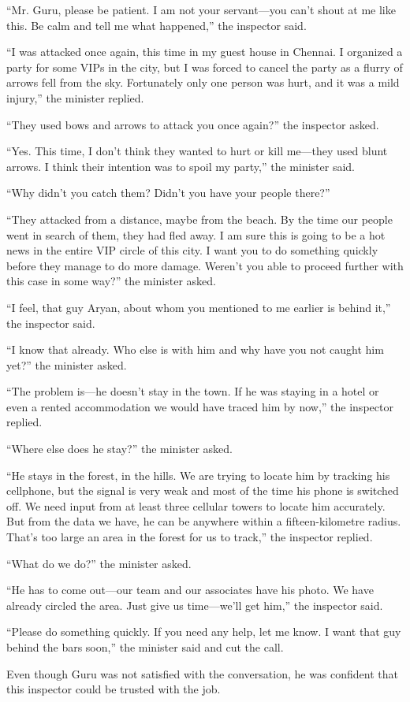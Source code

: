 “Mr. Guru, please be patient. I am not your servant—you can't shout at me like
this. Be calm and tell me what happened,” the inspector said.

“I was attacked once again, this time in my guest house in Chennai. I organized
a party for some VIPs in the city, but I was forced to cancel the party as a
flurry of arrows fell from the sky. Fortunately only one person was hurt, and it
was a mild injury,” the minister replied.

“They used bows and arrows to attack you once again?” the inspector asked.

“Yes. This time, I don't think they wanted to hurt or kill me—they used blunt
arrows. I think their intention was to spoil my party,” the minister said.

“Why didn't you catch them? Didn't you have your people there?”

“They attacked from a distance, maybe from the beach. By the time our people
went in search of them, they had fled away. I am sure this is going to be a hot
news in the entire VIP circle of this city. I want you to do something quickly
before they manage to do more damage. Weren't you able to proceed further with
this case in some way?” the minister asked.

“I feel, that guy Aryan, about whom you mentioned to me earlier is behind it,”
the inspector said.

“I know that already. Who else is with him and why have you not caught him yet?”
the minister asked.

“The problem is—he doesn't stay in the town. If he was staying in a hotel or
even a rented accommodation we would have traced him by now,” the inspector
replied.

“Where else does he stay?” the minister asked.

“He stays in the forest, in the hills. We are trying to locate him by tracking
his cellphone, but the signal is very weak and most of the time his phone is
switched off. We need input from at least three cellular towers to locate him
accurately. But from the data we have, he can be anywhere within a
fifteen-kilometre radius. That's too large an area in the forest for us to
track,” the inspector replied.

“What do we do?” the minister asked.

“He has to come out—our team and our associates have his photo. We have
already circled the area. Just give us time—we'll get him,” the inspector
said.

“Please do something quickly. If you need any help, let me know. I want that guy
behind the bars soon,” the minister said and cut the call.

Even though Guru was not satisfied with the conversation, he was confident that
this inspector could be trusted with the job.